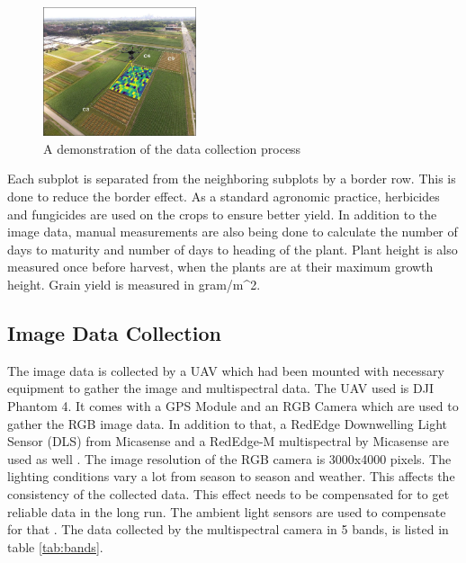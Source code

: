 \documentclass[sigconf, nonacm, natbib, screen, balance=False]{acmart}
\begin{document}
\begin{figure}[h]
  \centering
   \hspace*{-0.25in}
   \includegraphics[width=0.4\textwidth, angle=0,]{moghimi.jpg}
  \caption{A demonstration of the data collection process \cite{moghimi}}

  \label{fig:example}
\end{figure}


Each subplot is separated from the neighboring subplots by a border row. This is done to reduce the border effect. As a standard agronomic practice, herbicides and fungicides are used on the crops to ensure better yield. In addition to the image data, manual measurements are also being done to calculate the number of days to maturity and number of days to heading of the plant. Plant height is also measured once before harvest, when the plants are at their maximum growth height. Grain yield is measured in gram/m^2.

\subsection{Image Data Collection}\label{sec:aspect1}

The image data is collected by a UAV which had been mounted with necessary equipment to gather the image and multispectral data. The UAV used is DJI Phantom 4. It comes with a GPS Module and an RGB Camera which are used to gather the RGB image data. In addition to that, a RedEdge Downwelling Light Sensor (DLS) \cite{light_sensors:online} from Micasense and a RedEdge-M multispectral by Micasense \cite{RedEdgeM:online} are used as well \cite{lied}. The image resolution of the RGB camera is 3000x4000 pixels. 
The lighting conditions vary a lot from season to season and weather. This affects the consistency of the collected data. This effect needs to be compensated for to get reliable data in the long run. The ambient light sensors are used to compensate for that \cite{Bestpractices_mica:online}.
The data collected by the multispectral camera in 5 bands, is listed in table \ref{tab:bands}.
\end{document}
